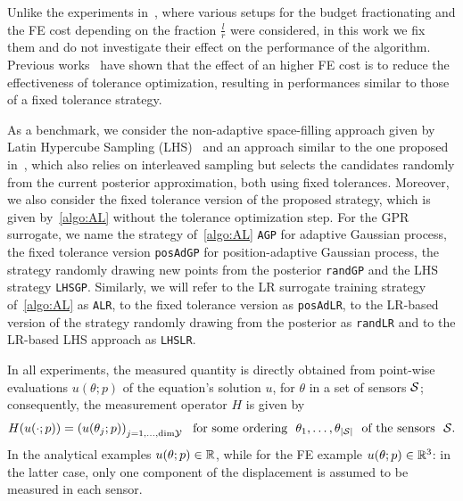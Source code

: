 Unlike the experiments in~\cite{VillaniArconesUngerWeiser2025}, where various setups for the budget fractionating and the FE cost depending on the fraction $\frac{l}{r}$ were considered, in this work we fix them and do not investigate their effect on the performance of the algorithm.
Previous works~\cite{SemlerWeiser2023,VillaniArconesUngerWeiser2025,VillaniUngerWeiser2024} have shown that the effect of an higher FE cost is to reduce the effectiveness of tolerance optimization, resulting in performances similar to those of a fixed tolerance strategy.

As a benchmark, we consider the non-adaptive space-filling approach given by Latin Hypercube Sampling (LHS)~\cite{McKayBeckmanConover1979} and an approach similar to the one proposed in~\cite{Dinkel2024}, which also relies on interleaved sampling but selects the candidates randomly from the current posterior approximation, both using fixed tolerances.
Moreover, we also consider the fixed tolerance version of the proposed strategy, which is given by~\ref{algo:AL} without the tolerance optimization step. 
For the GPR surrogate, we name the strategy of~\ref{algo:AL} \texttt{AGP} for adaptive Gaussian process, the fixed tolerance version \texttt{posAdGP} for position-adaptive Gaussian process, the strategy randomly drawing new points from the posterior \texttt{randGP} and the LHS strategy \texttt{LHSGP}.
Similarly, we will refer to the LR surrogate training strategy of~\ref{algo:AL} as \texttt{ALR}, to the fixed tolerance version as \texttt{posAdLR}, to the LR-based version of the strategy randomly drawing from the posterior as \texttt{randLR} and to the LR-based LHS approach as \texttt{LHSLR}. \medskip

In all experiments, the measured quantity is directly obtained from point-wise evaluations $u(\theta;p)$ of the equation's solution $u$, for $\theta$ in a set of sensors $\mathcal S$; consequently, the measurement operator $H$ is given by
\[
    H(u(\cdot; p)) = \left( u(\theta_j;p)\right)_{j=1,\ldots, \text{dim} \mathcal Y} \ \text{ for some ordering } \ \theta_1, \ldots, \theta_{|\mathcal S|} \ \text{ of the sensors } \ \mathcal S.
\]
In the analytical examples $u(\theta;p) \in \mathbb{R}$, while for the FE example $u(\theta;p)\in \mathbb{R}^3$: in the latter case, only one component of the displacement is assumed to be measured in each sensor. \medskip

